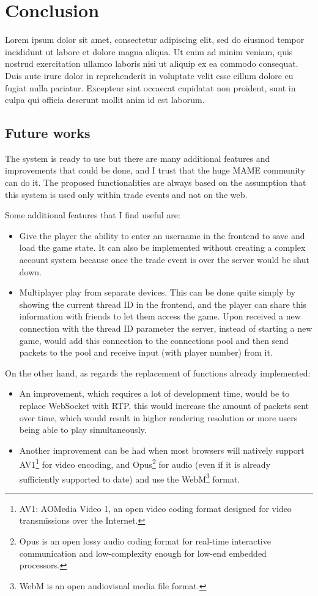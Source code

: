 \chapter{Conclusion}

Lorem ipsum dolor sit amet, consectetur adipiscing elit, sed do eiusmod tempor incididunt ut labore et dolore magna aliqua. Ut enim ad minim veniam, quis nostrud exercitation ullamco laboris nisi ut aliquip ex ea commodo consequat. Duis aute irure dolor in reprehenderit in voluptate velit esse cillum dolore eu fugiat nulla pariatur. Excepteur sint occaecat cupidatat non proident, sunt in culpa qui officia deserunt mollit anim id est laborum.

\section{Future works}
The system is ready to use but there are many additional features and improvements that could be done, and I trust that the huge MAME community can do it. The proposed functionalities are always based on the assumption that this system is used only within trade events and not on the web.

Some additional features that I find useful are:
\begin{itemize}
	\item Give the player the ability to enter an username in the frontend to save and load the game state. It can also be implemented without creating a complex account system because once the trade event is over the server would be shut down.
	\item Multiplayer play from separate devices. This can be done quite simply by showing the current thread ID in the frontend, and the player can share this information with friends to let them access the game. Upon received a new connection with the thread ID parameter the server, instead of starting a new game, would add this connection to the connections pool and then send packets to the pool and receive input (with player number) from it.
\end{itemize}

On the other hand, as regards the replacement of functions already implemented:
\begin{itemize}
	\item An improvement, which requires a lot of development time, would be to replace WebSocket with RTP, this would increase the amount of packets sent over time, which would result in higher rendering resolution or more users being able to play simultaneously.
	\item Another improvement can be had when most browsers will natively support AV1\footnote{AV1: AOMedia Video 1, an open video coding format designed for video transmissions over the Internet.} for video encoding, and Opus\footnote{Opus is an open lossy audio coding format for real-time interactive communication and low-complexity enough for low-end embedded processors.} for audio (even if it is already sufficiently supported to date) and use the WebM\footnote{WebM is an open audiovisual media file format.} format.
\end{itemize}